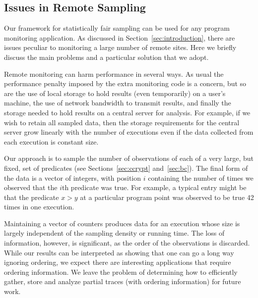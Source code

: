 \subsection{Issues in Remote Sampling}
\label{sec:compression}

Our framework for statistically fair sampling can be used for any
program monitoring application.  As discussed in
Section~\ref{sec:introduction}, there are issues peculiar to
monitoring a large number of remote sites.  Here we briefly discuss
the main problems and a particular solution that we adopt.

Remote monitoring can harm performance in several ways.  As usual the
performance penalty imposed by the extra monitoring code is a concern,
but so are the use of local storage to hold results (even temporarily)
on a user's machine, the use of network bandwidth to transmit results,
and finally the storage needed to hold results on a central server for
analysis.  For example, if we wish to retain all sampled data, then
the storage requirements for the central server grow linearly with the
number of executions even if the data collected from each execution is
constant size.

Our approach is to sample the number of observations of each of a very
large, but fixed, set of predicates (see Sections~\ref{sec:ccrypt}
and~\ref{sec:bc}).  The final form of the data is a vector of
integers, with position $i$ containing the number of times we observed
that the $i$th predicate was true.  For example, a typical entry might
be that the predicate $x > y$ at a particular program point was
observed to be true 42 times in one execution.

Maintaining a vector of counters produces data for an execution whose
size is largely independent of the sampling density or running time.
The loss of information, however, is significant, as the order
of the observations is discarded.  While our results can be interpreted
as showing that one can go a long way ignoring ordering, we expect
there are interesting applications that require ordering information.
We leave the problem of determining how to efficiently gather, store and
analyze partial traces (with ordering information) for future work.

